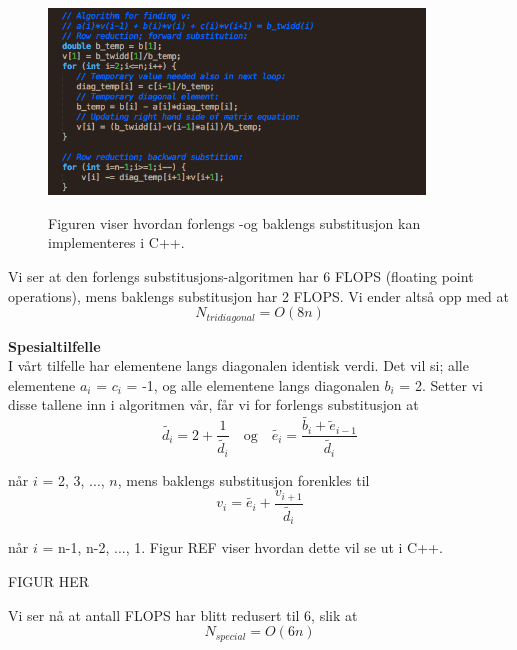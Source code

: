 \documentclass{article}
\begin{document}
\FloatBarrier
\begin{figure}[!ht]
  \begin{center}
  \includegraphics[width = 100mm]{gauss_algoritme.png}\\
  \caption{Figuren viser hvordan forlengs -og baklengs substitusjon kan implementeres i C++. }\label{fig:gausskode}
  \end{center}
\end{figure}
\FloatBarrier

Vi ser at den forlengs substitusjons-algoritmen har 6 FLOPS (floating point operations), mens baklengs substitusjon har 2 FLOPS. Vi ender altså opp med at 
\begin{equation}
N_{tridiagonal} = O(8n)
\end{equation}

\textbf{Spesialtilfelle}\\
I vårt tilfelle har elementene langs diagonalen identisk verdi. Det vil si; alle elementene $a_i$ = $c_i$ = -1, og alle elementene langs diagonalen $b_i$ = 2. Setter vi disse tallene inn i algoritmen vår, får vi for forlengs substitusjon at
\begin{equation}
\tilde{d_i} = 2 + \frac{1}{\tilde{d_i}} \quad \textrm{og} \quad \tilde{e_i} = \frac{\tilde{b_i} + \tilde{e}_{i-1}}{\tilde{d_i}}
\end{equation}

når $i$ = 2, 3, ..., $n$, mens baklengs substitusjon forenkles til
\begin{equation}
v_i = \tilde{e_i} + \frac{v_{i+1}}{\tilde{d_i}}
\end{equation}

når $i$ = n-1, n-2, ..., 1. Figur REF viser hvordan dette vil se ut i C++.

FIGUR HER

Vi ser nå at antall FLOPS har blitt redusert til 6, slik at 
\begin{equation}
N_{special} = O(6n)
\end{equation}
\end{document}

